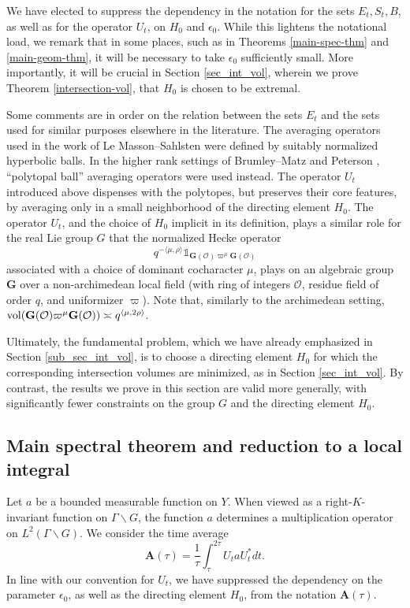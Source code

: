 \documentclass[12pt]{amsart}
\theoremstyle{remark}
\begin{document}
We have elected to suppress the dependency in the notation for the sets $E_t, S_t, B$, as well as for the operator $U_t$, on $H_0$ and $\epsilon_0$. While this lightens the notational load, we remark that in some places, such as in Theorems \ref{main-spec-thm} and \ref{main-geom-thm}, it will be necessary to take $\epsilon_0$ sufficiently small. More importantly, it will be crucial in Section \ref{sec_int_vol}, wherein we prove Theorem \ref{intersection-vol},  that $H_0$ is chosen to be extremal.

Some comments are in order on the relation between the sets $E_t$ and the sets used for similar purposes elsewhere in the literature. The averaging operators used in the work of Le Masson--Sahlsten \cite{Le_Masson_Sahlsten_17} were defined by suitably normalized hyperbolic balls. In the higher rank settings of Brumley--Matz \cite{Brumley_Matz_23} and Peterson \cite{Peterson_23}, ``polytopal ball'' averaging operators were used instead. The operator $U_t$ introduced above dispenses with the polytopes, but preserves their core features, by averaging only in a small neighborhood of the directing element $H_0$.  The operator $U_t$, and the choice of $H_0$ implicit in its definition, plays a similar role for the real Lie group $G$ that the normalized Hecke operator
\[
q^{-\langle \mu, \rho \rangle} \mathds{1}_{\mathbf{G}(\mathcal{O}) \varpi^\mu \mathbf{G}(\mathcal{O})}
\]
associated with a choice of dominant cocharacter $\mu$, plays on an algebraic group $\mathbf{G}$ over a non-archimedean local field (with ring of integers $\mathcal{O}$, residue field  of order $q$, and uniformizer $\varpi$). Note that, similarly to the archimedean setting, $\textnormal{vol}(\mathbf{G}(\mathcal{O}) \varpi^{\mu} \mathbf{G}(\mathcal{O})) \asymp q^{\langle \mu, 2 \rho \rangle}$. 

Ultimately, the fundamental problem, which we have already emphasized in Section \ref{sub_sec_int_vol}, is to choose a directing element $H_0$ for which the corresponding intersection volumes are minimized, as in Section \ref{sec_int_vol}. By contrast, the results we prove in this section are valid more generally, with significantly fewer constraints on the group $G$ and the directing element $H_0$. 

\subsection{Main spectral theorem and reduction to a local integral}\label{sec:reduction2local}
Let $a$ be a bounded measurable function on $Y$. When viewed as a right-$K$-invariant function on $\Gamma \backslash G$, the function $a$ determines a multiplication operator on $L^2(\Gamma \backslash G)$. We consider the time average
\begin{equation}\label{def:propagator}
\mathbf{A}(\tau)=\frac{1}{\tau}\int_{\tau}^{2\tau} U_t a U_t^* dt.
\end{equation}
In line with our convention for $U_t$, we have suppressed the dependency on the parameter $\epsilon_0$, as well as the directing element $H_0$, from the notation $\mathbf{A}(\tau)$.
\end{document}
